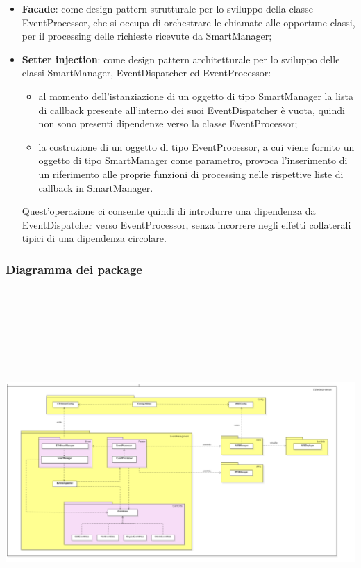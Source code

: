 \begin{itemize}
	\item \textbf{Facade}: come design pattern strutturale per lo sviluppo della classe EventProcessor, che si occupa di orchestrare le chiamate alle opportune classi, per il processing delle richieste ricevute da SmartManager;
	\item \textbf{Setter injection}: come design pattern architetturale per lo sviluppo delle classi SmartManager, EventDispatcher ed EventProcessor: 
	\begin{itemize}
		\item al momento dell'istanziazione di un oggetto di tipo SmartManager la lista di callback presente all'interno dei suoi EventDispatcher è vuota, quindi non sono presenti dipendenze verso la classe EventProcessor;
		\item la costruzione di un oggetto di tipo EventProcessor, a cui viene fornito un oggetto di tipo SmartManager come parametro, provoca l'inserimento di un riferimento alle proprie funzioni di processing nelle rispettive liste di callback in SmartManager.
	\end{itemize}
	Quest'operazione ci consente quindi di introdurre una dipendenza da EventDispatcher verso EventProcessor, senza incorrere negli effetti collaterali tipici di una dipendenza circolare.
\end{itemize}
\begin{landscape}
\subsubsection{Diagramma dei package}
	\includegraphics[width=21.5cm, height=14cm]{././diagrammi/etherless-server/Etherless-server-package.png}
\end{landscape}
